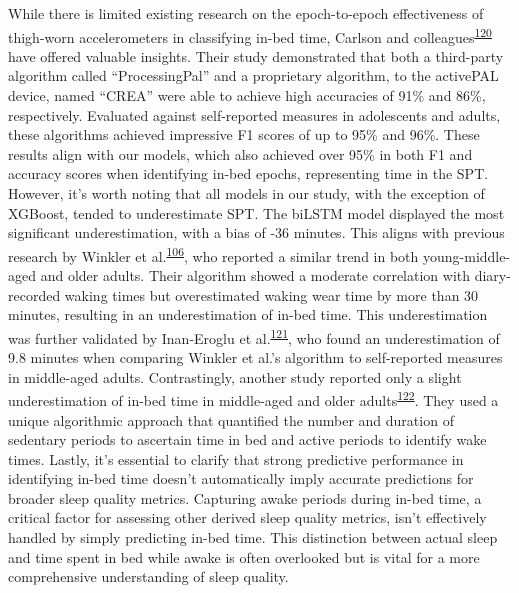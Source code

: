 \documentclass[
  10pt,
]{scrbook}
\begin{document}
While there is limited existing research on the epoch-to-epoch
effectiveness of thigh-worn accelerometers in classifying in-bed time,
Carlson and
colleagues\textsuperscript{\protect\hyperlink{ref-carlson_validity_2021}{120}}
have offered valuable insights. Their study demonstrated that both a
third-party algorithm called ``ProcessingPal'' and a proprietary
algorithm, to the activePAL device, named ``CREA'' were able to achieve
high accuracies of 91\% and 86\%, respectively. Evaluated against
self-reported measures in adolescents and adults, these algorithms
achieved impressive F1 scores of up to 95\% and 96\%. These results
align with our models, which also achieved over 95\% in both F1 and
accuracy scores when identifying in-bed epochs, representing time in the
SPT. However, it's worth noting that all models in our study, with the
exception of XGBoost, tended to underestimate SPT. The biLSTM model
displayed the most significant underestimation, with a bias of -36
minutes. This aligns with previous research by Winkler et
al.\textsuperscript{\protect\hyperlink{ref-winkler_identifying_2016}{106}},
who reported a similar trend in both young-middle-aged and older adults.
Their algorithm showed a moderate correlation with diary-recorded waking
times but overestimated waking wear time by more than 30 minutes,
resulting in an underestimation of in-bed time. This underestimation was
further validated by Inan-Eroglu et
al.\textsuperscript{\protect\hyperlink{ref-inan-eroglu_comparison_2021}{121}},
who found an underestimation of 9.8 minutes when comparing Winkler et
al.'s algorithm to self-reported measures in middle-aged adults.
Contrastingly, another study reported only a slight underestimation of
in-bed time in middle-aged and older
adults\textsuperscript{\protect\hyperlink{ref-van_der_berg_identifying_2016}{122}}.
They used a unique algorithmic approach that quantified the number and
duration of sedentary periods to ascertain time in bed and active
periods to identify wake times. Lastly, it's essential to clarify that
strong predictive performance in identifying in-bed time doesn't
automatically imply accurate predictions for broader sleep quality
metrics. Capturing awake periods during in-bed time, a critical factor
for assessing other derived sleep quality metrics, isn't effectively
handled by simply predicting in-bed time. This distinction between
actual sleep and time spent in bed while awake is often overlooked but
is vital for a more comprehensive understanding of sleep quality.
\end{document}
